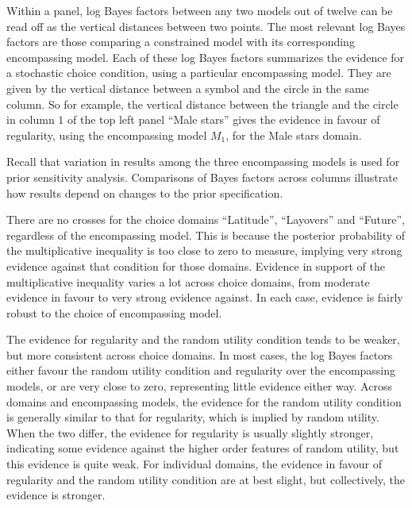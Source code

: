 \documentclass[11pt,letter]{article}
\begin{document}
Within a panel, log Bayes factors between any two models out of twelve can be read off as the vertical distances between two points.
The most relevant log Bayes factors are those comparing a constrained model with its corresponding encompassing model.
Each of these log Bayes factors summarizes the evidence for a stochastic choice condition, using a particular encompassing model.
They are given by the vertical distance between a symbol and the circle in the same column.
So for example, the vertical distance between the triangle and the circle in column $1$ of the top left panel ``Male stars'' gives the evidence in favour of regularity, using the encompassing model $M_1$, for the Male stars domain.

Recall that variation in results among the three encompassing models is used for prior sensitivity analysis.
Comparisons of Bayes factors across columns illustrate how results depend on changes to the prior specification.

There are no crosses for the choice domains ``Latitude'', ``Layovers'' and ``Future'', regardless of the encompassing model.
This is because the posterior probability of the multiplicative inequality is too close to zero to measure, implying very strong evidence against that condition for those domains.
Evidence in support of the multiplicative inequality varies a lot across choice domains, from moderate evidence in favour to very strong evidence against.
In each case, evidence is fairly robust to the choice of encompassing model.

The evidence for regularity and the random utility condition tends to be weaker, but more consistent across choice domains.
In most cases, the log Bayes factors either favour the random utility condition and regularity over the encompassing models, or are very close to zero, representing little evidence either way.
Across domains and encompassing models, the evidence for the random utility condition is generally similar to that for regularity, which is implied by random utility.
When the two differ, the evidence for regularity is usually slightly stronger, indicating some evidence against the higher order features of random utility, but this evidence is quite weak.
For individual domains, the evidence in favour of regularity and the random utility condition are at best slight, but collectively, the evidence is stronger.
\end{document}
